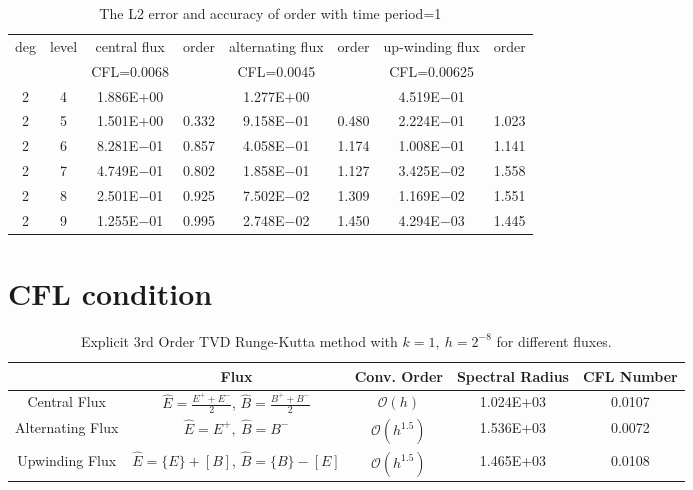 \documentclass[a4paper]{article}
\begin{document}
\begin{table}[htbp]
\caption{\label{tab:test}The L2 error and accuracy of order with time period=1}
\centering
\vspace{5pt}
\begin{tabular}{cccccccc}
\toprule
deg &level &central flux &order &alternating flux &order &up-winding flux &order\\
       &        &CFL=0.0068 &         &CFL=0.0045       &         &CFL=0.00625         &         \\
\midrule
2 &4 &1.886E+00 &         &1.277E+00 &        &4.519E$-$01 &        \\
2 &5 &1.501E+00 &0.332&9.158E$-$01 &0.480&2.224E$-$01 &1.023\\
2 &6 &8.281E$-$01 &0.857&4.058E$-$01 &1.174&1.008E$-$01 &1.141\\
2 &7 &4.749E$-$01 &0.802&1.858E$-$01 &1.127&3.425E$-$02 &1.558\\
2 &8 &2.501E$-$01 &0.925&7.502E$-$02 &1.309&1.169E$-$02 &1.551\\
2 &9 &1.255E$-$01 &0.995&2.748E$-$02 &1.450&4.294E$-$03 &1.445\\    
\bottomrule
\end{tabular}


\end{table}


\section{CFL condition}


\begin{table}
\centering
\caption*{Explicit 3rd Order TVD Runge-Kutta method with $k=1,\ h=2^{-8}$ for different fluxes.}
\begin{tabular}{c|c|ccc}
\toprule\hline
&Flux & Conv. Order  & Spectral Radius  &CFL Number\\ \hline \vspace{1pt}
Central Flux & $\hat{E}=\frac{E^++E^-}{2}$, $\hat{B}=\frac{B^++B^-}{2}$& $ \mathcal{O}(h)$ & 1.024E+03 &0.0107\\ \vspace{1pt}
Alternating Flux&$\hat{E}=E^+,\ \hat{B}=B^-$  & $\mathcal{O}(h^{1.5})$ &1.536E+03 &0.0072\\ \vspace{1pt}
Upwinding Flux &$\hat{E}=\{E\}+[B]$, $\hat{B}=\{B\}-[E]$  & $\mathcal{O}(h^{1.5})$ &1.465E+03 &0.0108\\ \hline\bottomrule
\end{tabular}
\end{table}
\end{document}
